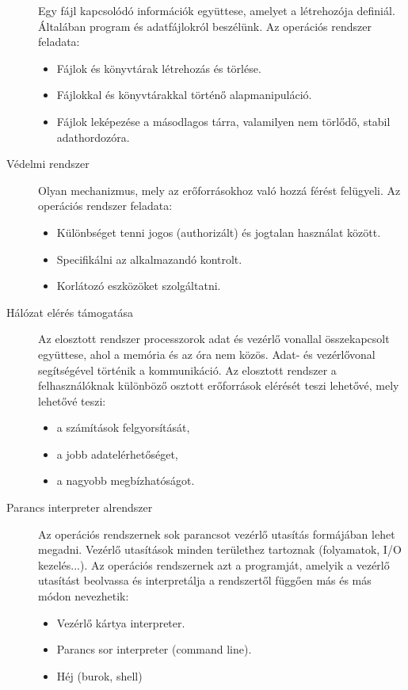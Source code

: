 \begin{description}
Egy fájl kapcsolódó információk együttese, amelyet a létrehozója definiál. Általában program és adatfájlokról beszélünk.
Az operációs rendszer feladata:
\begin{itemize}
	\item Fájlok és könyvtárak létrehozás és törlése.
	\item Fájlokkal és könyvtárakkal történő alapmanipuláció.
	\item Fájlok leképezése a másodlagos tárra, valamilyen nem törlődő, stabil adathordozóra.
\end{itemize}
\item[Védelmi rendszer]
Olyan mechanizmus, mely az erőforrásokhoz való hozzá férést felügyeli. Az operációs rendszer feladata:
\begin{itemize}
	\item Különbséget tenni jogos (authorizált) és jogtalan használat között.
	\item Specifikálni az alkalmazandó kontrolt.
	\item Korlátozó eszközöket szolgáltatni.
\end{itemize}
\item[Hálózat elérés támogatása]
Az elosztott rendszer processzorok adat és vezérlő vonallal összekapcsolt együttese, ahol a memória és az óra nem közös. Adat- és vezérlővonal segítségével történik a kommunikáció. Az elosztott rendszer a felhasználóknak különböző osztott erőforrások elérését teszi lehetővé, mely lehetővé teszi:
\begin{itemize}
	\item a számítások felgyorsítását,
	\item a jobb adatelérhetőséget,
	\item a nagyobb megbízhatóságot.
\end{itemize}
\item[Parancs interpreter alrendszer]
Az operációs rendszernek sok parancsot vezérlő utasítás formájában lehet megadni. Vezérlő utasítások minden területhez tartoznak (folyamatok, I/O kezelés...). Az operációs rendszernek azt a programját, amelyik a vezérlő utasítást beolvassa és interpretálja a rendszertől függően más és más módon nevezhetik:
\begin{itemize}
	\item Vezérlő kártya interpreter.
	\item Parancs sor interpreter (command line).
	\item Héj (burok, shell)
\end{itemize}
\end{description}

